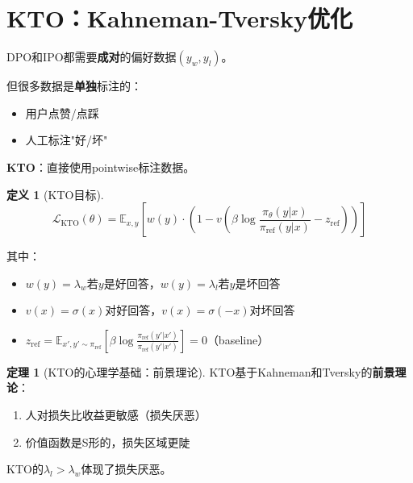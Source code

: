 \documentclass[11pt,a4paper]{article}
\theoremstyle{definition}
\newtheorem{definition}{定义}[section]
\newtheorem{theorem}{定理}[section]
\begin{document}
\section{KTO：Kahneman-Tversky优化}

\begin{plainwords}[为什么需要KTO]
DPO和IPO都需要\textbf{成对}的偏好数据$(y_w, y_l)$。

但很多数据是\textbf{单独}标注的：
\begin{itemize}
    \item 用户点赞/点踩
    \item 人工标注"好/坏"
\end{itemize}

\textbf{KTO}：直接使用pointwise标注数据。
\end{plainwords}

\begin{definition}[KTO目标]
\[
\mathcal{L}_{\text{KTO}}(\theta) = \mathbb{E}_{x, y}\left[w(y) \cdot \left(1 - v\left(\beta \log \frac{\pi_\theta(y|x)}{\pi_{\text{ref}}(y|x)} - z_{\text{ref}}\right)\right)\right]
\]

其中：
\begin{itemize}
    \item $w(y) = \lambda_w$若$y$是好回答，$w(y) = \lambda_l$若$y$是坏回答
    \item $v(x) = \sigma(x)$对好回答，$v(x) = \sigma(-x)$对坏回答
    \item $z_{\text{ref}} = \mathbb{E}_{x', y' \sim \pi_{\text{ref}}}[\beta \log \frac{\pi_{\text{ref}}(y'|x')}{\pi_{\text{ref}}(y'|x')}] = 0$（baseline）
\end{itemize}
\end{definition}

\begin{theorem}[KTO的心理学基础：前景理论]
KTO基于Kahneman和Tversky的\textbf{前景理论}：
\begin{enumerate}
    \item 人对损失比收益更敏感（损失厌恶）
    \item 价值函数是S形的，损失区域更陡
\end{enumerate}

KTO的$\lambda_l > \lambda_w$体现了损失厌恶。
\end{theorem}
\end{document}
